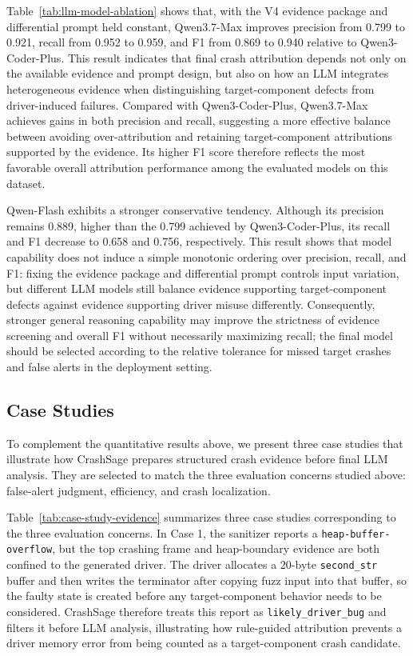 \documentclass[pdflatex,sn-basic]{sn-jnl}%
\theoremstyle{thmstyleone}%
\theoremstyle{thmstyletwo}%
\theoremstyle{thmstylethree}%
\begin{document}
Table~\ref{tab:llm-model-ablation} shows that, with the V4 evidence package and differential prompt held constant, Qwen3.7-Max improves precision from 0.799 to 0.921, recall from 0.952 to 0.959, and F1 from 0.869 to 0.940 relative to Qwen3-Coder-Plus. This result indicates that final crash attribution depends not only on the available evidence and prompt design, but also on how an LLM integrates heterogeneous evidence when distinguishing target-component defects from driver-induced failures. Compared with Qwen3-Coder-Plus, Qwen3.7-Max achieves gains in both precision and recall, suggesting a more effective balance between avoiding over-attribution and retaining target-component attributions supported by the evidence. Its higher F1 score therefore reflects the most favorable overall attribution performance among the evaluated models on this dataset.

Qwen-Flash exhibits a stronger conservative tendency. Although its precision remains 0.889, higher than the 0.799 achieved by Qwen3-Coder-Plus, its recall and F1 decrease to 0.658 and 0.756, respectively. This result shows that model capability does not induce a simple monotonic ordering over precision, recall, and F1: fixing the evidence package and differential prompt controls input variation, but different LLM models still balance evidence supporting target-component defects against evidence supporting driver misuse differently. Consequently, stronger general reasoning capability may improve the strictness of evidence screening and overall F1 without necessarily maximizing recall; the final model should be selected according to the relative tolerance for missed target crashes and false alerts in the deployment setting.

\FloatBarrier

\subsection{Case Studies}
\label{subsec:case-studies}

To complement the quantitative results above, we present three case studies that illustrate how CrashSage prepares structured crash evidence before final LLM analysis. They are selected to match the three evaluation concerns studied above: false-alert judgment, efficiency, and crash localization.

Table~\ref{tab:case-study-evidence} summarizes three case studies corresponding to the three evaluation concerns. In Case 1, the sanitizer reports a \texttt{heap-buffer-overflow}, but the top crashing frame and heap-boundary evidence are both confined to the generated driver.
The driver allocates a 20-byte \texttt{second\_str} buffer and then writes the terminator after copying fuzz input into that buffer, so the faulty state is created before any target-component behavior needs to be considered.
CrashSage therefore treats this report as \texttt{likely\_driver\_bug} and filters it before LLM analysis, illustrating how rule-guided attribution prevents a driver memory error from being counted as a target-component crash candidate.
\end{document}
